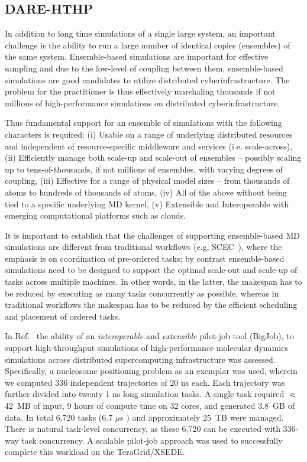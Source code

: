 \documentclass[]{svjour3}
\begin{document}
\subsection{DARE-HTHP}

In addition to long time simulations of a single large system, an
important challenge is the ability to run a large number of identical
copies (ensembles) of the same system. Ensemble-based simulations are
important for effective sampling and due to the low-level of coupling
between them, ensemble-based simulations are good candidates to
utilize distributed cyberinfrastructure.  The problem for the
practitioner is thus effectively marshaling thousands if not millions
of high-performance simulations on distributed cyberinfrastructure.

Thus fundamental support for an ensemble of simulations with the
following characters is required: (i) Usable on a range of underlying
distributed resources and independent of resource-specific middleware
and services (i.e. scale-across), (ii) Efficiently manage both
scale-up and scale-out of ensembles -- possibly scaling up to
tens-of-thousands, if not millions of ensembles, with varying degrees
of coupling, (iii) Effective for a range of physical model sizes --
from thousands of atoms to hundreds of thousands of atoms, (iv) All of
the above without being tied to a specific underlying MD kernel, (v)
Extensible and Interoperable with emerging computational platforms
such as clouds.

It is important to establish that the challenges of supporting
ensemble-based MD simulations are different from traditional workflows
(e.g, SCEC~\cite{scec-sc10}), where the emphasis is on coordination of
pre-ordered tasks; by contrast ensemble-based simulations need to be
designed to support the optimal scale-out and scale-up of tasks across
multiple machines. In other words, in the latter, the makespan has to
be reduced by executing as many tasks concurrently as possible,
whereas in traditional workflows the makespan has to be reduced by the
efficient scheduling and placement of ordered tasks.

In Ref.~\cite{bigjob-ccgrid12} the ability of an {\it interoperable}
and {\it extensible} pilot-job tool (BigJob), to support
high-throughput simulations of high-performance molecular dynamics
simulations across distributed supercomputing infrastructure was
assessed.  Specifically, a nucleosome positioning problem as an
exemplar was used, wherein we computed 336 independent trajectories of
20 ns each.  Each trajectory was further divided into twenty 1 ns long
simulation tasks. A single task required $\approx$ 42~MB of input, 9
hours of compute time on 32 cores, and generated 3.8~GB of data.  In
total 6,720 tasks (6.7 $ \mu $s ) and approximately 25~TB were
managed.  There is natural task-level concurrency, as these 6,720 can
be executed with 336-way task concurrency.  A scalable pilot-job
approach was used to successfully complete this workload on the
TeraGrid/XSEDE.
\end{document}
